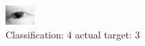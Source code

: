 \begin{figure}[h!]
\begin{center}
\includegraphics[width=0.60\columnwidth]{figures/ID98_class_4_target_3.png}
\end{center}
\caption{ Classification: 4 actual target: 3}
\label{fig:ID98_class_4_target_3}
\end{figure}
